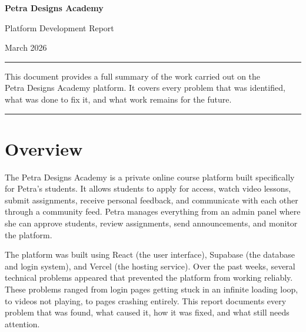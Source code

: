 \documentclass[12pt, a4paper]{article}
\begin{document}
\begin{titlepage}
  \centering
  \vspace*{3cm}
  {\Huge\bfseries\color{brandpurple} Petra Designs Academy\par}
  \vspace{0.5cm}
  {\Large\color{darkgray} Platform Development Report\par}
  \vspace{0.3cm}
  {\normalsize\color{darkgray} March 2026\par}
  \vspace{2cm}
  \rule{10cm}{0.4pt}\par
  \vspace{0.5cm}
  {\normalsize\color{darkgray}
    This document provides a full summary of the work carried out on the\\
    Petra Designs Academy platform. It covers every problem that was identified,\\
    what was done to fix it, and what work remains for the future.
  \par}
  \vspace{2cm}
  \rule{10cm}{0.4pt}\par
\end{titlepage}

\tableofcontents
\newpage

\section{Overview}

The Petra Designs Academy is a private online course platform built specifically for Petra's students. It allows students to apply for access, watch video lessons, submit assignments, receive personal feedback, and communicate with each other through a community feed. Petra manages everything from an admin panel where she can approve students, review assignments, send announcements, and monitor the platform.

The platform was built using React (the user interface), Supabase (the database and login system), and Vercel (the hosting service). Over the past weeks, several technical problems appeared that prevented the platform from working reliably. These problems ranged from login pages getting stuck in an infinite loading loop, to videos not playing, to pages crashing entirely. This report documents every problem that was found, what caused it, how it was fixed, and what still needs attention.
\end{document}
